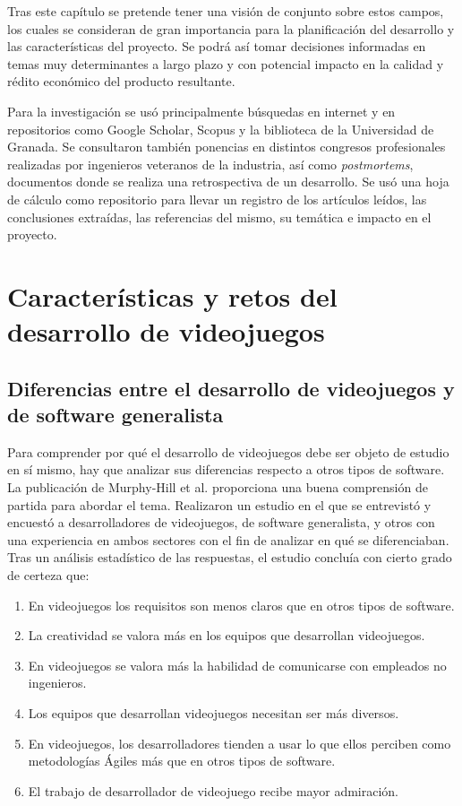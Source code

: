 Tras este capítulo se pretende tener una visión de conjunto sobre estos campos, los cuales se consideran de gran importancia para la planificación del desarrollo y las características del proyecto. Se podrá así tomar decisiones informadas en temas muy determinantes a largo plazo y con potencial impacto en la calidad y rédito económico del producto resultante.


Para la investigación se usó principalmente búsquedas en internet y en repositorios como Google Scholar, Scopus y la biblioteca de la Universidad de Granada. Se consultaron también ponencias en distintos congresos profesionales realizadas por ingenieros veteranos de la industria, así como \textit{postmortems}, documentos donde se realiza una retrospectiva de un desarrollo. Se usó una hoja de cálculo como repositorio para llevar un registro de los artículos leídos, las conclusiones extraídas, las referencias del mismo, su temática e impacto en el proyecto.

\section{Características y retos del desarrollo de videojuegos}

\subsection{Diferencias entre el desarrollo de videojuegos y de software generalista}

Para comprender por qué el desarrollo de videojuegos debe ser objeto de estudio en sí mismo, hay que analizar sus diferencias respecto a otros tipos de software. La publicación de Murphy-Hill et al.\cite{murphy-hill} proporciona una buena comprensión de partida para abordar el tema. Realizaron un estudio en el que se entrevistó y encuestó a desarrolladores de videojuegos, de software generalista, y otros con una experiencia en ambos sectores con el fin de analizar en qué se diferenciaban. Tras un análisis estadístico de las respuestas, el estudio concluía con cierto grado de certeza que:

\begin{enumerate}
    \item En videojuegos los requisitos son menos claros que en otros tipos de software.
    \item La creatividad se valora más en los equipos que desarrollan videojuegos.
    \item En videojuegos se valora más la habilidad de comunicarse con empleados no ingenieros.
    \item Los equipos que desarrollan videojuegos necesitan ser más diversos.
    \item En videojuegos, los desarrolladores tienden a usar lo que ellos perciben como metodologías Ágiles más que en otros tipos de software.
    \item El trabajo de desarrollador de videojuego recibe mayor admiración. 
\end{enumerate}

